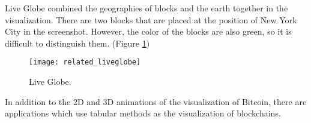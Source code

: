 \begin{itemize}
        Live Globe combined the geographies of blocks and the earth together in the visualization. There are two blocks that are placed at the position of New York City in the screenshot. However, the color of the blocks are also green, so it is difficult to distinguish them. (Figure \ref{fig:live globe})
        \begin{figure}[htb]
            \centering
            \texttt{[image: related\_liveglobe]}
            \caption{Live Globe.}
            \label{fig:live globe}
        \end{figure}
\end{itemize}

\clearpage

In addition to the 2D and 3D animations of the visualization of Bitcoin, there are applications which use tabular methods as the visualization of blockchains.


